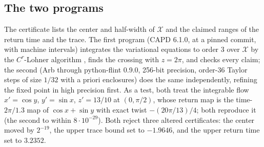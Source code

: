 \documentclass[11pt]{article}
\theoremstyle{definition}
\theoremstyle{remark}
\begin{document}
\begin{appendices}
\section{The two programs}\label{app:checks}
The certificate lists the center and half-width of $\mathcal X$ and the claimed ranges
of the return time and the trace. The first program (CAPD 6.1.0, at a pinned
commit, with machine intervals) integrates the variational equations to
order $3$ over $\mathcal X$ by the $C^r$-Lohner algorithm \cite{WZ}, finds the crossing with $z=2\pi$, and checks every claim;
the second (Arb through python-flint 0.9.0, 256-bit precision, order-36
Taylor steps of size $1/32$ with a priori enclosures) does the same
independently, refining the fixed point in high precision first. As a test,
both treat the integrable flow $x'=\cos y$, $y'=\sin x$, $z'=13/10$ at $(0,\pi/2)$,
whose return map is the time-$2\pi/1.3$ map of $\cos x+\sin y$ with exact
twist $-(20\pi/13)/4$; both reproduce it (the second to within
$8\cdot10^{-29}$). Both reject three altered certificates: the center moved
by $2^{-19}$, the upper trace bound set to $-1.9646$, and the upper return
time set to $3.2352$.
\end{appendices}
\end{document}
